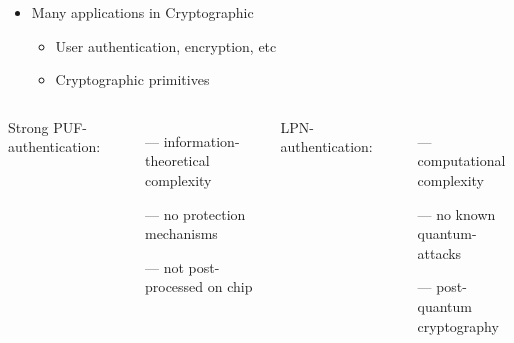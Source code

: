 \documentclass{beamer}
\begin{document}
\begin{frame}
	\begin{itemize}
		\item Many applications in Cryptographic %
		\begin{itemize}
			\item User authentication, encryption, etc
			\item Cryptographic primitives%
		\end{itemize}
	\end{itemize}
\vspace{0.5cm}
\begin{columns}[c]
	\column{6cm}
	
		Strong PUF-authentication:
		\begin{itemize}
			\item [---] information-theoretical complexity
			\item [---] no protection mechanisms
			\item [---]	not post-processed on chip
		\end{itemize}
	\column{6cm}
		LPN-authentication:
		\begin{itemize}
		\item [---] computational complexity
		\item [---] no known quantum-attacks 
		\item [---]	post-quantum cryptography
		\end{itemize}		
\end{columns}
	
\end{frame}


\end{document}
